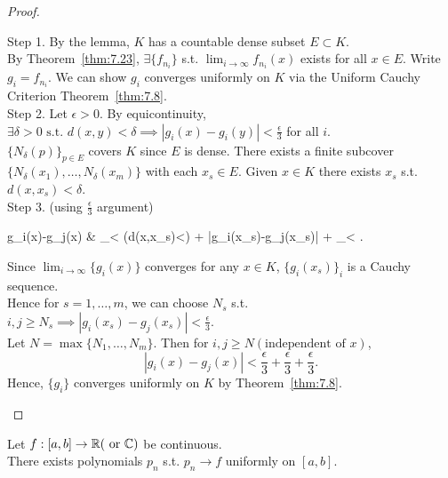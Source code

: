 \begin{thm}[25]
\begin{proof}
\begin{enumerate}
			      Step 1. By the lemma, $K$ has a countable dense subset $E \subset K$.\\
			      By Theorem~\ref{thm:7.23}, $\exists{\{f_{n_i}\}}$ s.t. $\lim_{i\to \infty}{f_{n_i}(x)}$ exists for all $x \in E$.
			      Write $g_{i}=f_{n_i}$. We can show $g_i$ converges uniformly on $K$ via the Uniform Cauchy Criterion Theorem~\ref{thm:7.8}.\\
			      Step 2. Let $\epsilon>0$. By equicontinuity, $\exists{\delta > 0} \text{ s.t. } d(x,y) < \delta \implies \left|g_{i}(x)-g_{i}(y)\right|<\frac{\epsilon}{3}$ for all $i$.\\
			      $\{ {N}_{\delta}(p)\}_{p \in E}$ covers $K$ since $E$ is dense.
			      There exists a finite subcover $\{N_{\delta}(x_1),\ldots ,N_{\delta}(x_{m})\}$ with each $x_s \in E$. Given $x \in K$ there exists $x_s$ s.t. $d(x,x_s)<\delta$.\\
			      Step 3. (using $\frac{\epsilon}{3}$ argument)\\
			      \begin{flalign*}
				      g_{i}(x)-g_{j}(x) & \le {}_{< \;\; (\because d(x,x_s)<\delta)} + \left|g_{i}(x_s)-g_{j}(x_s)\right| + _{<}
				      .\end{flalign*}

			      Since $\lim_{i\to \infty}{\{g_{i}(x)\}}$ converges for any $x \in K$, $\{g_{i}(x_s)\}_i$ is a Cauchy sequence.\\
			      Hence for $s=1,\ldots ,m$, we can choose $N_s$ s.t. $ i,j\ge N_{s}\implies \left|g_{i}(x_{s})-g_{j}(x_{s})\right| <\frac{\epsilon}{3}$.\\
			      Let $N= \max\{N_1,\ldots ,N_m\}$. Then for $i,j\ge N (\text{independent of }x)$,
			      \[
				      \left|g_i(x)-g_j(x)\right|<\frac{\epsilon}{3}+\frac{\epsilon}{3}+\frac{\epsilon}{3}
				      .\]
			      Hence, $\{g_{i}\}$ converges uniformly on $K$ by Theorem~\ref{thm:7.8}.
		\end{enumerate}
	\end{proof}
\end{thm}


\begin{thm}
	Let $f: [a,b]\to \mathbb{R} (\text{ or } \mathbb{C})$ be continuous.\\
	There exists polynomials $p_{n}$ s.t. $p_{n}\to f$ uniformly on $[a,b]$.
\end{thm}

